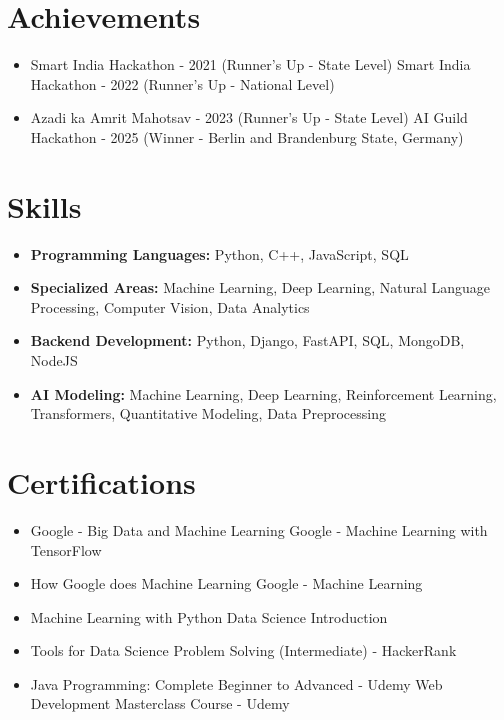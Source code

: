\documentclass[a4paper,10pt]{article}
\begin{document}
\section*{Achievements}
\begin{itemize}
\item Smart India Hackathon - 2021 (Runner's Up - State Level) \hfill Smart India Hackathon - 2022 (Runner's Up - National Level)
\item Azadi ka Amrit Mahotsav - 2023 (Runner's Up - State Level) \hfill AI Guild Hackathon - 2025 (Winner - Berlin and Brandenburg State, Germany)
\end{itemize}

\section*{Skills}
\begin{itemize}
  \item \textbf{Programming Languages:} Python, C++, JavaScript, SQL
  \item \textbf{Specialized Areas:} Machine Learning, Deep Learning, Natural Language Processing, Computer Vision, Data Analytics
  \item \textbf{Backend Development:} Python, Django, FastAPI, SQL, MongoDB, NodeJS
  \item \textbf{AI Modeling:} Machine Learning, Deep Learning, Reinforcement Learning, Transformers, Quantitative Modeling, Data Preprocessing
\end{itemize}

\section*{Certifications}
\begin{itemize}
\item Google - Big Data and Machine Learning \hfill Google - Machine Learning with TensorFlow
\item How Google does Machine Learning \hfill Google - Machine Learning
\item Machine Learning with Python \hfill Data Science Introduction
\item Tools for Data Science \hfill Problem Solving (Intermediate) - HackerRank
\item Java Programming: Complete Beginner to Advanced - Udemy \hfill Web Development Masterclass Course - Udemy
\end{itemize}
\end{document}
